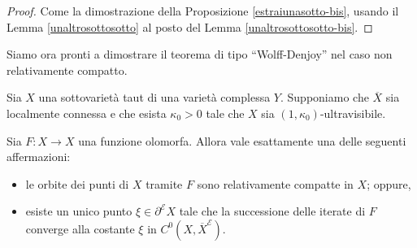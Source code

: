 \begin{proof}
    Come la dimostrazione della Proposizione \ref{estraiunasotto-bis}, usando il Lemma \ref{unaltrosottosotto} al posto del Lemma \ref{unaltrosottosotto-bis}.
\end{proof}

Siamo ora pronti a dimostrare il teorema di tipo ``Wolff-Denjoy'' nel caso non relativamente compatto.

\begin{thm} \label{wd_type_ill}
    Sia $X$ una sottovarietà taut di una varietà complessa $Y$. Supponiamo che $\overline{X}$ sia localmente connessa e che esista $\kappa_0>0$ tale che $X$ sia $(1,\kappa_0)$-ultravisibile.
    
    Sia $F:X \longrightarrow X$ una funzione olomorfa. Allora vale esattamente una delle seguenti affermazioni:
    \begin{itemize}
        \item le orbite dei punti di $X$ tramite $F$ sono relativamente compatte in $X$; oppure,
        \item esiste un unico punto $\xi\in\partial^\mathcal{E}X$ tale che la successione delle iterate di $F$ converge alla costante $\xi$ in $C^0(X,\overline{X}^\mathcal{E})$.
    \end{itemize}
\end{thm}

